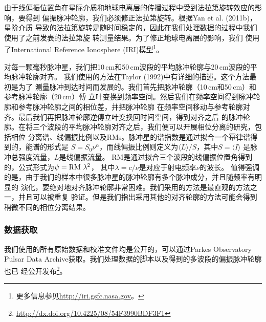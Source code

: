 由于线偏振位置角在星际介质和地球电离层的传播过程中受到法拉第旋转效应的影响，要得到
偏振脉冲轮廓，我们必须修正法拉第旋转。根据Yan et al. (2011b)\supercite{Yan11b}，星阶介质
导致的法拉第旋转是随时间稳定的，因此在我们处理数据的过程中我们使用了之前发表的法拉第旋
转测量结果\supercite{Keith11,Yan11b,Keith12,Burgay13}。为了修正地球电离层的影响，我们
使用了International Reference Ionosphere (IRI)模型\footnote{更多信息参见\url{http://iri.gsfc.nasa.gov}。}。 

对每一颗毫秒脉冲星，我们把10\,cm和50\,cm波段的平均脉冲轮廓与20\,cm波段的平均脉冲轮廓对齐。
我们使用的方法在Taylor (1992)\supercite{Taylor92}中有详细的描述。这个方法最初是为了
测量脉冲到达时间而发展的。我们首先把脉冲轮廓（10\,cm和50\,cm）和参考脉冲轮廓（20\,cm）傅
立叶变换到频率空间。然后我们在频率空间得到脉冲轮廓和参考脉冲轮廓之间的相位差，并把脉冲轮廓
在频率空间移动与参考轮廓对齐。最后我们再把脉冲轮廓逆傅立叶变换回时间空间，得到对齐之后
的脉冲轮廓。在将三个波段的平均脉冲轮廓对齐之后，我们便可以开展相位分离的研究，包括相位
分离谱、线偏振比例以及RMs。脉冲星的谱指数是通过拟合一个幂律谱得到的，能谱的形式是
$S=S_{0}\nu^{\alpha}$，而线偏振比例则定义为$\langle L \rangle/S$，其中$S=\langle I\rangle$
是脉冲总强度流量，$L$是线偏振流量。
%
RM是通过拟合三个波段的线偏振位置角得到的，公式形式为$\psi=\rm{RM}\ \lambda^{2}$，
其中$\lambda=c/\nu$是对应于射电频率$\nu$的波长。
%
值得强调的是，由于我们的样本中很多脉冲星的脉冲轮廓有多个脉冲成分，并且随频率有明显的
演化，要绝对地对齐脉冲轮廓非常困难。我们采用的方法是最直观的方法之一，并且可以被重复
验证。但是我们指出采用其他的对齐轮廓的方法可能会得到稍微不同的相位分离结果。

\subsubsection{数据获取}

我们使用的所有原始数据和校准文件均是公开的，可以通过Parkes Observatory Pulsar Data 
Archive\supercite{Hobbs11}获取。我们处理数据的脚本以及得到的多波段的偏振脉冲轮廓也已
经公开发布\footnote{\url{http://dx.doi.org/10.4225/08/54F3990BDF3F1}}。

